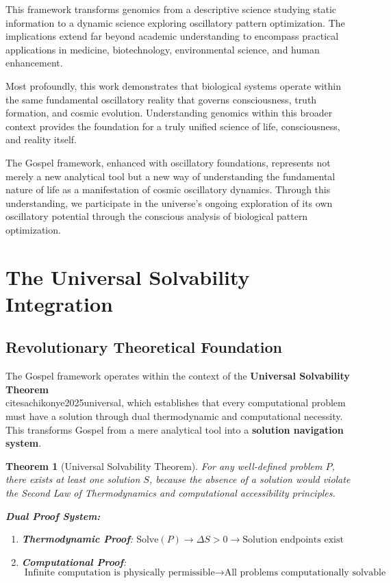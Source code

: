 \documentclass[12pt,a4paper]{article}
\newtheorem{theorem}{Theorem}[section]
\begin{document}
This framework transforms genomics from a descriptive science studying static information to a dynamic science exploring oscillatory pattern optimization. The implications extend far beyond academic understanding to encompass practical applications in medicine, biotechnology, environmental science, and human enhancement.

Most profoundly, this work demonstrates that biological systems operate within the same fundamental oscillatory reality that governs consciousness, truth formation, and cosmic evolution. Understanding genomics within this broader context provides the foundation for a truly unified science of life, consciousness, and reality itself.

The Gospel framework, enhanced with oscillatory foundations, represents not merely a new analytical tool but a new way of understanding the fundamental nature of life as a manifestation of cosmic oscillatory dynamics. Through this understanding, we participate in the universe's ongoing exploration of its own oscillatory potential through the conscious analysis of biological pattern optimization.

\section{The Universal Solvability Integration}

\subsection{Revolutionary Theoretical Foundation}

The Gospel framework operates within the context of the \textbf{Universal Solvability Theorem} \\cite{sachikonye2025universal}, which establishes that every computational problem must have a solution through dual thermodynamic and computational necessity. This transforms Gospel from a mere analytical tool into a \textbf{solution navigation system}.

\begin{theorem}[Universal Solvability Theorem]
For any well-defined problem $P$, there exists at least one solution $S$, because the absence of a solution would violate the Second Law of Thermodynamics and computational accessibility principles.

\textbf{Dual Proof System:}
\begin{enumerate}
\item \textbf{Thermodynamic Proof}: $\text{Solve}(P) \rightarrow \Delta S > 0 \rightarrow \text{Solution endpoints exist}$
\item \textbf{Computational Proof}: $\text{Infinite computation is physically permissible} \rightarrow \text{All problems computationally solvable}$
\end{enumerate}
\end{theorem}
\end{document}
